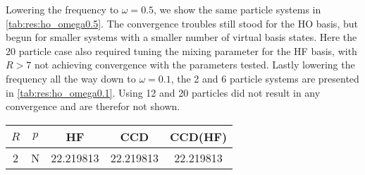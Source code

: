 Lowering the frequency to $\omega = 0.5$, we show the same particle systems in \cref{tab:res:ho_omega0.5}. The convergence troubles still stood for the HO basis, but begun for smaller systems with a smaller number of virtual basis states. Here the 20 particle case also required tuning the mixing parameter for the HF basis, with $R > 7$ not achieving convergence with the parameters tested.
Lastly lowering the frequency all the way down to $\omega = 0.1$, the 2 and 6 particle systems are presented in \cref{tab:res:ho_omega0.1}. Using 12 and 20 particles did not result in any convergence and are therefor not shown.
\clearpage
\begin{table*}
    \hfill
    \begin{subtable}[h]{0.45\textwidth}
        \centering
        \begin{tabular}{ccccc}
            \toprule
            $R$ & $p$ & HF & CCD & CCD(HF) \\
            \midrule
            2 & N & 22.219813 & 22.219813 & 22.219813 \\

\end{tabular}
\end{subtable}
\end{table*}
